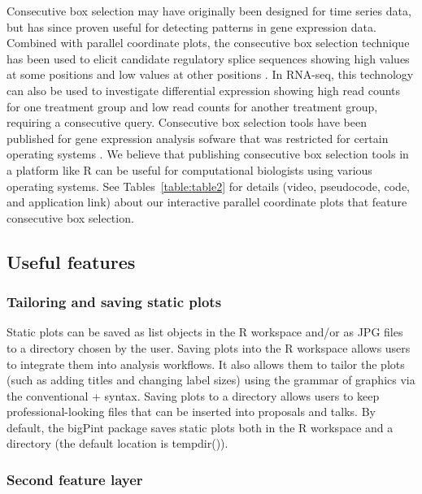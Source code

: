 \documentclass[parskip=full]{bmcart} %
\begin{document}
Consecutive box selection may have originally been designed for time series data, but has since proven useful for detecting patterns in gene expression data. Combined with parallel coordinate plots, the consecutive box selection technique has been used to elicit candidate regulatory splice sequences showing high values at some positions and low values at other positions \cite{hochheiser2003dynamic}. In RNA-seq, this technology can also be used to investigate differential expression showing high read counts for one treatment group and low read counts for another treatment group, requiring a consecutive query. Consecutive box selection tools have been published for gene expression analysis sofware that was restricted for certain operating systems \cite{hochheiser2003dynamic}. We believe that publishing consecutive box selection tools in a platform like R can be useful for computational biologists using various operating systems. See Tables~\ref{table:table2} for details (video, pseudocode, code, and application link) about our interactive parallel coordinate plots that feature consecutive box selection.

\subsection*{Useful features}

\subsubsection*{Tailoring and saving static plots}

Static plots can be saved as list objects in the R workspace and/or as JPG files to a directory chosen by the user. Saving plots into the R workspace allows users to integrate them into analysis workflows. It also allows them to tailor the plots (such as adding titles and changing label sizes) using the grammar of graphics via the conventional + syntax. Saving plots to a directory allows users to keep professional-looking files that can be inserted into proposals and talks. By default, the bigPint package saves static plots both in the R workspace and a directory (the default location is tempdir()).

\subsubsection*{Second feature layer}
\end{document}
